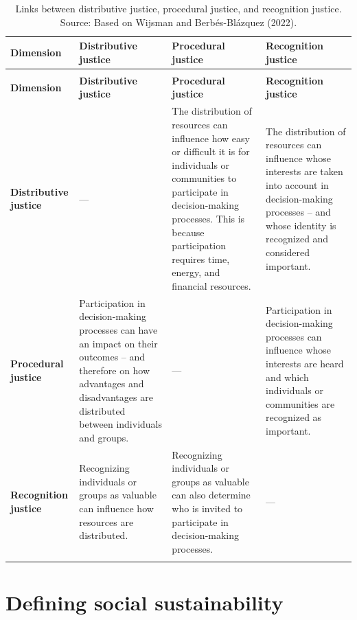 \documentclass[
  a4paper,
  DIV=11,
  numbers=noendperiod,
  oneside,
  openany]{scrreprt}
\begin{document}
\begin{longtable}[t]{>{\raggedright\arraybackslash}p{1.6cm}>{\raggedright\arraybackslash}p{3.25cm}>{\raggedright\arraybackslash}p{3.25cm}>{\raggedright\arraybackslash}p{3.25cm}}

\caption{\label{tbl-justice-matrix}Links between distributive justice,
procedural justice, and recognition justice. Source: Based on Wijsman
and Berbés-Blázquez (2022).}

\tabularnewline

\toprule
\textbf{Dimension} & \textbf{Distributive justice} & \textbf{Procedural justice} & \textbf{Recognition justice}\\
\midrule
\endfirsthead
\multicolumn{4}{@{}l}{\textit{(continued)}}\\
\toprule
\textbf{Dimension} & \textbf{Distributive justice} & \textbf{Procedural justice} & \textbf{Recognition justice}\\
\midrule
\endhead

\endfoot
\bottomrule
\endlastfoot
\textbf{Distributive justice} & — & The distribution of resources can influence how easy or difficult it is for individuals or communities to participate in decision-making processes. This is because participation requires time, energy, and financial resources. & The distribution of resources can influence whose interests are taken into account in decision-making processes – and whose identity is recognized and considered important.\\
\textbf{Procedural justice} & Participation in decision-making processes can have an impact on their outcomes – and therefore on how advantages and disadvantages are distributed between individuals and groups. & — & Participation in decision-making processes can influence whose interests are heard and which individuals or communities are recognized as important.\\
\textbf{Recognition justice} & Recognizing individuals or groups as valuable can influence how resources are distributed. & Recognizing individuals or groups as valuable can also determine who is invited to participate in decision-making processes. & —\\*

\end{longtable}

\endgroup{}

\section{Defining social
sustainability}\label{defining-social-sustainability}
\end{document}
